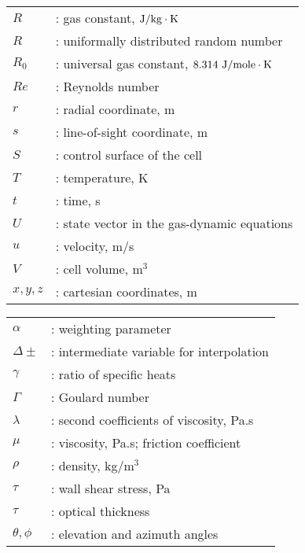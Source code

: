 \documentclass[12pt,a4paper,twoside]{article}
\begin{document}
\begin{tabular}{ll}
$R$	& : gas constant, $\rm J/kg \cdot K$ \\
$R$  & : uniformally distributed random number \\
$R_0$	& : universal gas constant, $\rm 8.314~J/mole \cdot K$ \\
$Re$	& : Reynolds number \\
$r$            & : radial coordinate, m \\
$s$           & : line-of-sight coordinate, m \\
$S$            & : control surface of the cell \\
$T$	& : temperature, K \\
$t$	& : time, s \\
$U$	& : state vector in the gas-dynamic equations \\
$u$            & : velocity, m/s \\
$V$            & : cell volume, m$^3$ \\
$x, y, z$      & : cartesian coordinates, m \\
\end{tabular}

\begin{tabular}{ll}
$\alpha$	& : weighting parameter \\
$\Delta\pm$     & : intermediate variable for interpolation \\
$\gamma$       & : ratio of specific heats \\
$\Gamma$      & : Goulard number \\        
$\lambda$ & : second coefficients of viscosity, Pa.s \\
$\mu$		& : viscosity, Pa.s; friction coefficient \\
$\rho$         & : density, kg/m$^3$ \\
$\tau$		& : wall shear stress, Pa \\
$\tau$                 & : optical thickness \\
$\theta, \phi$     & : elevation and azimuth angles \\              
\end{tabular}
\end{document}
